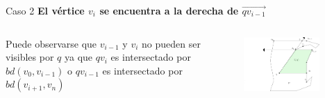 \documentclass[aspectratio=169,xcolor=dvipsnames, t]{beamer}
\begin{document}

\begin{frame}{Caso 2}
    \textbf{El vértice $v_{i}$ se encuentra a la derecha de $\overrightarrow{qv_{i-1}}$}\\
    \vspace{0.5cm}
    \begin{columns}
    \begin{column}{0.45\textwidth}
        Puede observarse que $v_{i-1}$ y $v_{i}$ no pueden ser visibles por $q$ ya que $qv_{i}$ es intersectado por $bd(v_{0}, v_{i-1})$ o $qv_{i-1}$ es intersectado por $bd(v_{i+1}, v_{n})$ 
    \end{column}
    \begin{column}{0.45\textwidth}  %
        \begin{figure}
            \centering
            \includegraphics[width=0.9\textwidth]{imagenes/Caso2.4b.png}
        \end{figure}
    \end{column}
    \end{columns}
\end{frame}

\end{document}
